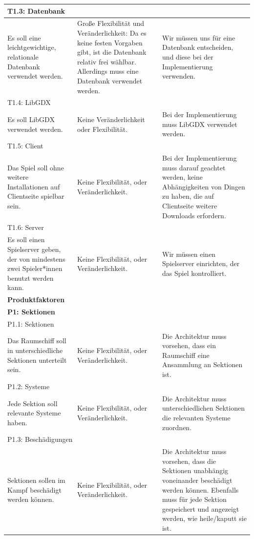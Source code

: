 \documentclass[fontsize=12pt,paper=a4,twoside]{scrartcl}
\begin{document}
\begin{longtable}[c]{|p{5cm}|p{5cm}|p{5cm}|}
\multicolumn{3}{|l|}{{T1.3: Datenbank}} 
\\ \hline
Es soll eine leichtgewichtige, relationale Datenbank verwendet werden. & Große Flexibilität und Veränderlichkeit: Da es keine festen Vorgaben gibt, ist die Datenbank relativ frei wählbar. Allerdings muss eine Datenbank verwendet werden. & Wir müssen uns für eine Datenbank entscheiden, und diese bei der Implementierung verwenden. 
\\ \hline
\multicolumn{3}{|l|}{{T1.4: LibGDX}} 
\\ \hline
Es soll LibGDX verwendet werden. & Keine Veränderlichkeit oder Flexibilität.   & Bei der Implementierung muss LibGDX verwendet werden. 
\\ \hline
\multicolumn{3}{|l|}{{T1.5: Client}} 
\\ \hline
Das Spiel soll ohne weitere Installationen auf Clientseite spielbar sein. & Keine Flexibilität, oder Veränderlichkeit.    &  Bei der Implementierung muss darauf geachtet werden, keine Abhängigkeiten von Dingen zu haben, die auf Clientseite weitere Downloads erfordern. 
\\ \hline
\multicolumn{3}{|l|}{{T1.6: Server}} 
\\ \hline
Es soll einen Spielserver geben, der von mindestens zwei Spieler*innen benutzt werden kann. & Keine Flexibilität, oder Veränderlichkeit.    & Wir müssen einen Spielserver einrichten, der das Spiel kontrolliert. 
\\ \hline
\multicolumn{3}{|l|}{{\textbf{Produktfaktoren}}} 
\\ \hline
%
\multicolumn{3}{|l|}{{\textbf{P1: Sektionen}}} 
\\ \hline
\multicolumn{3}{|l|}{{P1.1: Sektionen}} 
\\ \hline
Das Raumschiff soll in unterschiedliche Sektionen unterteilt sein. & Keine Flexibilität, oder Veränderlichkeit.    & Die Architektur muss vorsehen, dass ein Raumschiff eine Ansammlung an Sektionen ist. 
\\ \hline 
\multicolumn{3}{|l|}{{P1.2: Systeme}} 
\\ \hline
Jede Sektion soll relevante Systeme haben.  & Keine Flexibilität, oder Veränderlichkeit.    & Die Architektur muss unterschiedlichen Sektionen die relevanten Systeme zuordnen. 
\\ \hline
\multicolumn{3}{|l|}{{P1.3: Beschädigungen}} 
\\ \hline
Sektionen sollen im Kampf beschädigt werden können.  & Keine Flexibilität, oder Veränderlichkeit.    & Die Architektur muss vorsehen, dass die Sektionen unabhängig voneinander beschädigt werden können. Ebenfalls muss für jede Sektion gespeichert und angezeigt werden, wie heile/kaputt sie ist. 

\end{longtable}
\end{document}
